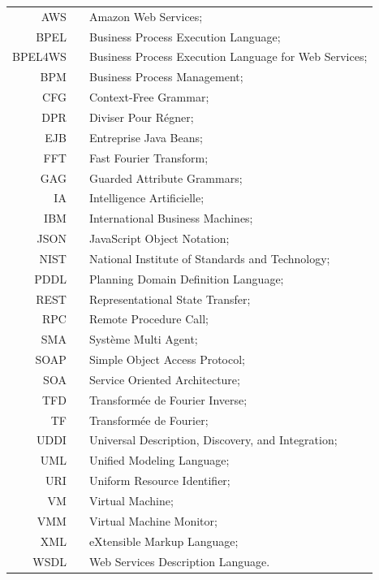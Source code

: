 \begin{center}
	\begin{tabular}[t]{rp{5mm}p{12cm}}
                   AWS & & Amazon Web Services;\\
        BPEL & & Business Process Execution Language; \\
        BPEL4WS & & Business Process Execution Language for Web Services; \\
        BPM & & Business Process Management; \\
        CFG & & Context-Free Grammar;\\
        DPR & & Diviser Pour Régner;\\
        EJB & & Entreprise Java Beans; \\
        FFT & & Fast Fourier Transform;\\
        GAG & & Guarded Attribute Grammars; \\
        IA & & Intelligence Artificielle; \\
        IBM & & International Business Machines; \\
        JSON & & JavaScript Object Notation;\\
        NIST & & National Institute of Standards and Technology;\\
        PDDL & & Planning Domain Definition Language; \\
        REST & & Representational State Transfer; \\
        RPC & & Remote Procedure Call;\\
        SMA & & Système Multi Agent;\\
        SOAP & & Simple Object Access Protocol;\\
        SOA & & Service Oriented Architecture;\\
        TFD & & Transformée de Fourier Inverse;\\
        TF & & Transformée de Fourier;\\
        UDDI & & Universal Description, Discovery, and Integration;\\
        UML & & Unified Modeling Language;\\
        URI & & Uniform Resource Identifier;\\
        VM & & Virtual Machine;\\
        VMM & & Virtual Machine Monitor;\\
        XML & & eXtensible Markup Language;\\
        WSDL & & Web Services Description Language.\\
        
	\end{tabular}
\end{center}
